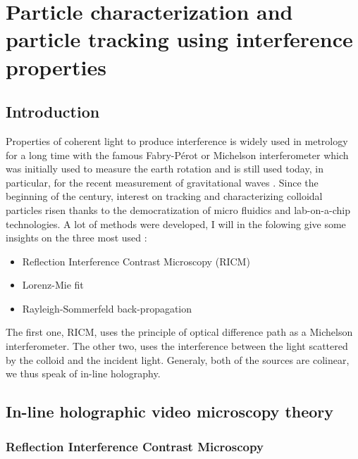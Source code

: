 \newpage
\section{Particle characterization and particle tracking using interference properties}
		\label{sec:chapter2}

\subsection{Introduction}

Properties of coherent light to produce interference is widely used in metrology for a long time with the famous Fabry-Pérot  \cite{fabry_theorie_1899, perot_application_1899} or Michelson interferometer \cite{michelson_relative_1887} which was initially used to measure the earth rotation and is still used today, in particular, for the recent measurement of gravitational waves
\cite{ligo_scientific_collaboration_and_virgo_collaboration_gw151226_2016}. 
Since the beginning of the century, interest on tracking and characterizing colloidal particles risen thanks to the democratization of micro fluidics and lab-on-a-chip technologies. A lot of methods were developed, I will in the folowing give some insights on the three most used :

\begin{itemize}
	\item Reflection Interference Contrast Microscopy (\gls{RICM})
	\item Lorenz-Mie fit
	\item Rayleigh-Sommerfeld back-propagation
\end{itemize}

The first one, \gls{RICM}, uses the principle of optical difference path as a Michelson interferometer. The other two, uses the interference between the light scattered by the colloid and the incident light. Generaly, both of the sources are colinear, we thus speak of in-line holography. 

\subsection{In-line holographic video microscopy theory}

\subsubsection{Reflection Interference Contrast Microscopy}

